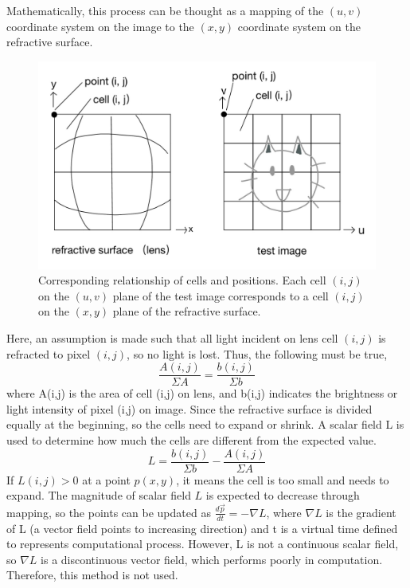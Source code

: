 \documentclass[10pt,two column]{configuration/unoesc}
\begin{document}
Mathematically, this process can be thought as a mapping of the $(u,v)$ coordinate system on the image to the $(x,y)$ coordinate system on the refractive surface.\\ 

\begin{figure}[h!]
\centering
\includegraphics[width=1.0\linewidth]{figures/figure2.jpg} 
    \caption{Corresponding relationship of cells and positions. Each cell $(i,j)$ on the $(u,v)$ plane of the test image corresponds to a cell $(i,j)$ on the $(x,y)$ plane of the refractive surface.}
\label{fig:2}
\end{figure}

Here, an assumption is made such that all light incident on lens cell $(i,j)$ is refracted to pixel $(i,j)$, so no light is lost. Thus, the following must be true,
\begin{equation}
    \frac{A(i,j)}{\Sigma A} = \frac{b(i,j)}{\Sigma b}
\end{equation}
where A(i,j) is the area of cell (i,j) on lens, and b(i,j) indicates the brightness or light intensity of pixel (i,j) on image. Since the refractive surface is divided equally at the beginning, so the cells need to expand or shrink. A scalar field L is used to determine how much the cells are different from the expected value.
\begin{equation}
    L = \frac{b(i,j)}{\Sigma b} -\frac{A(i,j)}{\Sigma A}
\end{equation}
If $L(i,j)>0$ at a point $p(x,y)$, it means the cell is too small and needs to expand. The magnitude of scalar field $L$ is expected to decrease through mapping, so the points can be updated as $\frac{d\vec p}{dt}=-\nabla L$, where $\nabla L$ is the gradient of L (a vector field points to increasing direction) and t is a virtual time defined to represents computational process. However, L is not a continuous scalar field, so $\nabla L$ is a discontinuous vector field, which performs poorly in computation. Therefore, this method is not used.\\
\end{document}
